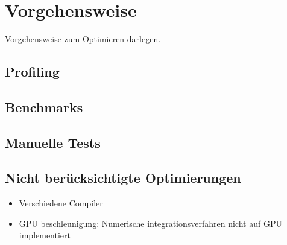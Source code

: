 \chapter{Vorgehensweise}

Vorgehensweise zum Optimieren darlegen.

\section{Profiling}

\section{Benchmarks}

\section{Manuelle Tests}

\section{Nicht berücksichtigte Optimierungen}

\begin{itemize}
    \item Verschiedene Compiler
    \item GPU beschleunigung: Numerische integrationsverfahren nicht auf GPU implementiert
\end{itemize}